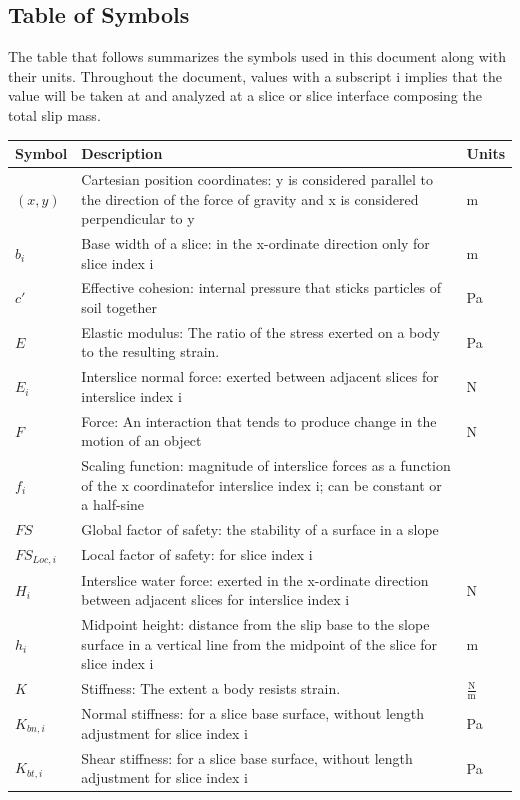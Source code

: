 \documentclass[12pt]{article}
\begin{document}
\subsection{Table of Symbols}
\label{Sec:TablofSymb}
The table that follows summarizes the symbols used in this document along with their units. Throughout the document, values with a subscript i implies that the value will be taken at and analyzed at a slice or slice interface composing the total slip mass.
\begin{longtable*}{l l l}
\toprule
Symbol & Description & Units
\\
\midrule
$(x,y)$ & Cartesian position coordinates: y is considered parallel to the direction of the force of gravity and x is considered perpendicular to y & m
\\
$b_{i}$ & Base width of a slice: in the x-ordinate direction only for slice index i & m
\\
$c'$ & Effective cohesion: internal pressure that sticks particles of soil together & Pa
\\
$E$ & Elastic modulus: The ratio of the stress exerted on a body to the resulting strain. & Pa
\\
$E_{i}$ & Interslice normal force: exerted between adjacent slices for interslice index i & N
\\
$F$ & Force: An interaction that tends to produce change in the motion of an object & N
\\
$f_{i}$ & Scaling function: magnitude of interslice forces as a function of the x coordinatefor interslice index i; can be constant or a half-sine & 
\\
$FS$ & Global factor of safety: the stability of a surface in a slope & 
\\
$FS_{Loc,i}$ & Local factor of safety: for slice index i & 
\\
$H_{i}$ & Interslice water force: exerted in the x-ordinate direction between adjacent slices for interslice index i & N
\\
$h_{i}$ & Midpoint height: distance from the slip base to the slope surface in a vertical line from the midpoint of the slice for slice index i & m
\\
$K$ & Stiffness: The extent a body resists strain. & $\frac{\text{N}}{\text{m}}$
\\
$K_{bn,i}$ & Normal stiffness: for a slice base surface, without length adjustment for slice index i & Pa
\\
$K_{bt,i}$ & Shear stiffness: for a slice base surface, without length adjustment for slice index i & Pa

\end{longtable*}
\end{document}
